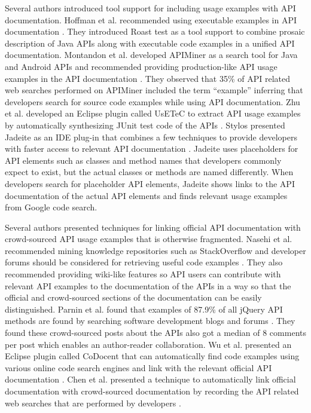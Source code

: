 \documentclass[11pt,oneside]{book}
\begin{document}
Several authors introduced tool support for including usage examples with API documentation. Hoffman et al. recommended using executable examples in API documentation \cite{Hoffman_api_documentation}. They introduced Roast test as a tool support  to combine prosaic description of Java APIs along with executable code examples in a unified API documentation. Montandon et al. developed APIMiner as a search tool for Java and Android APIs and recommended providing production-like API usage examples in the API documentation \cite{montandon2013documenting}. They observed that 35\% of API related web searches performed on APIMiner included the term “example” inferring that developers search for source code examples while using API documentation. Zhu et al. developed an Eclipse plugin called UsETeC to extract API usage examples by automatically synthesizing JUnit test code of the APIs \cite{zhu2014mining}. Stylos presented Jadeite as an IDE plug-in that combines a few techniques to provide developers with faster access to relevant API documentation \cite{Jadeite}. Jadeite uses placeholders for API elements such as classes and method names that developers commonly expect to exist, but the actual classes or methods are named differently. When developers search for placeholder API elements, Jadeite shows links to the API documentation of the actual API elements and finds relevant usage examples from Google code search.

Several authors presented techniques for linking official API documentation with crowd-sourced API usage examples that is otherwise fragmented. Nasehi et al. recommended mining knowledge repositories such as StackOverflow and developer forums should be considered for retrieving useful code examples \cite{Nasehi_what_makes}. They also recommended providing wiki-like features so API users can contribute with relevant API examples to the documentation of the APIs in a way so that the official and crowd-sourced sections of the documentation can be easily distinguished. Parnin et al. found that examples of 87.9\% of all jQuery API methods are found by searching software development blogs and forums \cite{Parnin_measuring}. They found these crowd-sourced posts about the APIs also got a median of 8 comments per post which enables an author-reader collaboration. Wu et al. presented an Eclipse plugin called CoDocent that can automatically find code examples using various online code search engines and link with the relevant official API documentation \cite{wu2010codocent}. Chen et al. presented a technique to automatically link official documentation with crowd-sourced documentation by recording the API related web searches that are performed by developers \cite{Chen_who_asked}.
\end{document}
